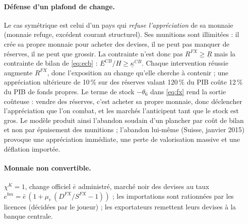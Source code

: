 \documentclass[11pt,a4paper]{article}
\begin{document}
\paragraph{Défense d'un plafond de change.} Le cas symétrique est celui d'un pays qui \emph{refuse l'appréciation} de sa monnaie (monnaie refuge, excédent courant structurel). Ses munitions sont illimitées : il crée sa propre monnaie pour acheter des devises, il ne peut pas manquer de réserves, il ne peut que grossir. La contrainte n'est donc pas $R^{FX}\ge\underline R$ mais la contrainte de bilan de \eqref{eq:ecb} : $E^{CB}/H \ge \underline\kappa^{CB}$. Chaque intervention réussie augmente $R^{FX}$, donc l'exposition au change qu'elle cherche à contenir ; une appréciation ultérieure de 10\,\% sur des réserves valant 120\,\% du PIB coûte 12\,\% du PIB de fonds propres. Le terme de stock $-\theta_6$ dans \eqref{eq:fx} rend la sortie coûteuse : vendre des réserves, c'est acheter sa propre monnaie, donc déclencher l'appréciation que l'on combat, et les marchés l'anticipent tant que le stock est gros. Le modèle produit ainsi l'abandon soudain d'un plancher par coût de bilan et non par épuisement des munitions ; l'abandon lui-même (Suisse, janvier 2015) provoque une appréciation immédiate, une perte de valorisation massive et une déflation importée.

\paragraph{Monnaie non convertible.} $\chi^K = 1$, change officiel $\bar e$ administré, marché noir des devises au taux $e^{bm} = \bar e\,(1+\mu_e\,(D^{FX}/S^{FX} - 1))$ ; les importations sont rationnées par les licences (décidées par le joueur) ; les exportateurs remettent leurs devises à la banque centrale.
\end{document}
